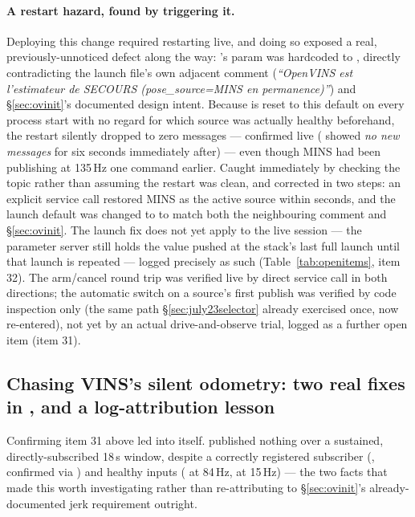 \paragraph{A restart hazard, found by triggering it.} Deploying this change
required restarting  live, and doing so exposed a real,
previously-unnoticed defect along the way: 's  param was hardcoded to ,
directly contradicting the launch file's own adjacent comment
(\emph{``OpenVINS est l'estimateur de SECOURS (pose\_source=MINS en
permanence)''}) and \S\ref{sec:ovinit}'s documented design intent. Because
 is reset to this default on every process start with no
regard for which source was actually healthy beforehand, the restart
silently dropped  to zero messages — confirmed
live ( showed \emph{no new messages} for six seconds
immediately after) — even though MINS had been publishing at 135\,Hz one
command earlier. Caught immediately by checking the topic rather than
assuming the restart was clean, and corrected in two steps: an explicit
service call restored MINS as the active source within seconds, and the
launch default was changed to  to match both the neighbouring
comment and \S\ref{sec:ovinit}. The launch fix does not yet apply to the
live session — the parameter server still holds the value pushed at the
stack's last full launch until that launch is repeated — logged precisely
as such (Table~\ref{tab:openitems}, item 32). The arm/cancel round trip was
verified live by direct service call in both directions; the automatic
switch on a source's first publish was verified by code inspection only
(the same path \S\ref{sec:july23selector} already exercised once, now
re-entered), not yet by an actual drive-and-observe trial, logged as a
further open item (item 31).

\subsection{Chasing VINS's silent odometry: two real fixes in
, and a log-attribution lesson}
\label{sec:july24vinsdebug}
Confirming item 31 above led into  itself.  published nothing over a sustained, directly-subscribed 18\,s
window, despite a correctly registered subscriber
(, confirmed via ) and healthy
inputs ( at 84\,Hz,  at 15\,Hz) — the two facts that made this worth
investigating rather than re-attributing to \S\ref{sec:ovinit}'s
already-documented jerk requirement outright.

